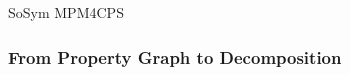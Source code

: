 \begin{copiedFrom}{SoSym MPM4CPS}

\subsubsection{From Property Graph to Decomposition}


\end{copiedFrom}
